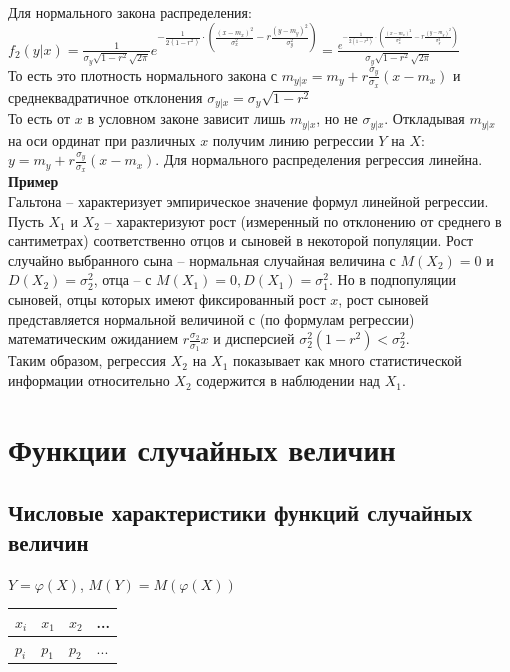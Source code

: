 \documentclass[russian, 12pt, fleqn]{article}
\begin{document}
\\
Для нормального закона распределения:\\
 $f_2(y|x) = \frac{1}{\sigma_y \sqrt{1 - r^2} \sqrt{2\pi}} \displaystyle{  e^{{-\frac{1}{2(1-r^2)}\cdot \left(\frac{(x-m_x)^2}{\sigma_x^2}  -r \frac{(y-m_y)^2}{\sigma_y^2}\right)}}  	}= \displaystyle{  \frac{  e^{{-\frac{1}{2(1-r^2)}\cdot \left (\frac{(x-m_x)^2}{\sigma_x^2}  -r \frac{(y-m_y)^2}{\sigma_y^2}\right )}} }{\sigma_y \sqrt{1 - r^2} \sqrt{2\pi}}}$\\
То есть это плотность нормального закона с $m_{y|x} = m_y + r \frac{\sigma_y}{\sigma_x} (x - m_x)$  и среднеквадратичное отклонения $\sigma_{y|x} = \sigma_{y} \sqrt{1-r^2}$ \\
То есть от $x$ в условном законе зависит лишь $m_{y|x}$, но не $\sigma_{y|x}$. Откладывая  $m_{y|x}$ на оси ординат при различных $x$ получим линию регрессии $Y$  на $X$: $y=m_y + r\frac{\sigma_y}{\sigma_x}(x-m_x)$. Для нормального распределения регрессия линейна.\\
\textbf{Пример}\\
Гальтона -- характеризует эмпирическое значение формул линейной регрессии. Пусть $X_1$ и $X_2$ -- характеризуют рост (измеренный по отклонению от среднего в сантиметрах) соответственно отцов и сыновей в некоторой популяции. Рост случайно выбранного сына -- нормальная случайная величина с $M(X_2) = 0$ и $D(X_2) = \sigma_2^2$,
отца -- с $M(X_1) = 0, D(X_1) = \sigma_1^2$. Но в подпопуляции сыновей, отцы которых имеют фиксированный рост $x$, рост сыновей представляется нормальной величиной с (по формулам регрессии) математическим ожиданием  $r\frac{\sigma_2}{\sigma_1} x$ и дисперсией $\sigma_2^2(1-r^2) < \sigma_2^2$.\\
Таким образом, регрессия $X_2$ на $X_1$ показывает как много статистической информации относительно $X_2$ содержится в наблюдении над $X_1$.\\
\section{Функции случайных величин}
\subsection{Числовые характеристики функций случайных величин}
\noindent

$Y = \varphi(X)$, $M(Y) = M(\varphi(X))$\\

\begin{tabular}[b]{ | l | l |  l | l | }
\hline
$x_i$&$x_1$&$x_2$&...\\
\hline
$p_i$&$p_1$&$p_2$&...\\
\hline
\end{tabular}\\
\end{document}
